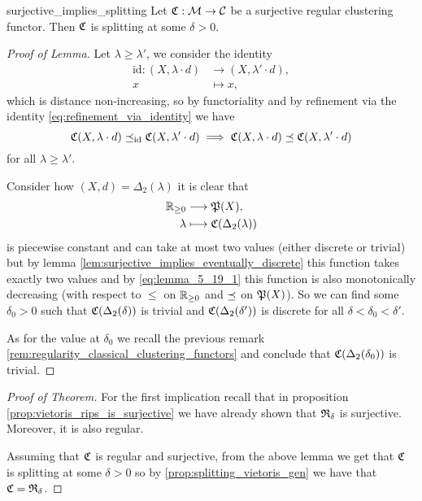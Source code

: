 \begin{lemma}{}{surjective_implies_splitting}
    Let $\Cf: \M \to \C$ be a surjective regular clustering functor. Then $\Cf$ is splitting at some $\delta > 0$.


\end{lemma}

\begin{proof}[Proof of Lemma]
    Let $\lambda \ge \lambda'$, we consider the identity
    \begin{align*}
        \mathrm{id}: (X, \lambda \cdot d) &\longrightarrow (X, \lambda' \cdot d),\\
        x &\longmapsto x,
    \end{align*}
    which is distance non-increasing, so by functoriality and by refinement via the identity \eqref{eq:refinement_via_identity} we have
    \begin{equation}
    \label{eq:lemma_5_19_1}
    \Cf(X, \lambda \cdot d) \refines_\mathrm{id} \Cf(X, \lambda' \cdot d) \implies \Cf(X, \lambda \cdot d) \refines \Cf(X, \lambda' \cdot d)
    \end{equation}
    for all $\lambda \ge \lambda'$.

    Consider how $(X,d) = \Delta_2(\lambda)$ it is clear that
    \begin{align*}
        \R_{\geq0} &\longrightarrow \P(X), \\
        \lambda &\longmapsto \Cf(\Delta_2(\lambda))
    \end{align*}
    is piecewise constant and can take at most two values (either discrete or trivial) but by lemma \ref{lem:surjective_implies_eventually_discrete} this function takes exactly two values and by \eqref{eq:lemma_5_19_1} this function is also monotonically decreasing (with respect to $\le$ on $\R_{\geq0}$ and $\refines$ on $\P(X)$).
    So we can find some $\delta_0 > 0$ such that $\Cf(\Delta_2(\delta))$ is trivial and $\Cf(\Delta_2(\delta'))$ is discrete for all $\delta < \delta_0 < \delta'$.

    As for the value at $\delta_0$ we recall the previous remark \ref{rem:regularity_classical_clustering_functors} and conclude that $\Cf(\Delta_2(\delta_0))$ is trivial.
\end{proof}

\begin{proof}[Proof of Theorem]
    For the first implication recall that in proposition \ref{prop:vietoris_rips_is_surjective} we have already shown that $\Rf_\delta$ is surjective. Moreover, it is also regular.

    Assuming that $\Cf$ is regular and surjective, from the above lemma we get that $\Cf$ is splitting at some $\delta > 0$ so by \ref{prop:splitting_vietoris_gen} we have that $\Cf = \Rf_{\delta}$.
\end{proof}

